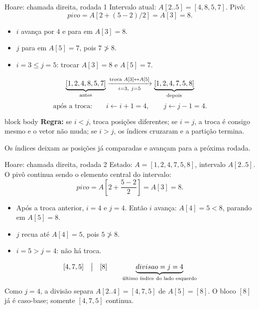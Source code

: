 \documentclass[aspectratio=169,11pt]{beamer}
\begin{document}
\begin{frame}{Hoare: chamada direita, rodada 1}
  \small
  Intervalo atual: \(A[2..5]=[4,8,5,7]\). Pivô:
  \[
    pivo=A[2+(5-2)/2]=A[3]=8.
  \]
  \begin{itemize}
    \item \(i\) avança por \(4\) e para em \(A[3]=8\).
    \item \(j\) para em \(A[5]=7\), pois \(7\not>8\).
    \item \(i=3\leq j=5\): trocar \(A[3]=8\) e \(A[5]=7\).
  \end{itemize}
  \[
    \underbrace{[1,2,4,8,5,7]}_{\text{\scriptsize antes}}
    \xrightarrow[\ i=3,\ j=5\ ]{\text{\scriptsize troca }A[3]\leftrightarrow A[5]}
    \underbrace{[1,2,4,7,5,8]}_{\text{\scriptsize depois}}
  \]
  \[
    \text{após a troca:}\qquad
    i\gets i+1=4,\qquad j\gets j-1=4.
  \]
  \begin{beamercolorbox}[wd=\linewidth,sep=.45em]{block body}
    \centering
    \textbf{Regra:} se \(i<j\), troca posições diferentes;
    se \(i=j\), a troca é consigo mesmo e o vetor não muda;
    se \(i>j\), os índices cruzaram e a partição termina.
  \end{beamercolorbox}
  \scriptsize Os índices deixam as posições já comparadas e avançam para a próxima rodada.
\end{frame}

\begin{frame}{Hoare: chamada direita, rodada 2}
  \small
  Estado: \(A=[1,2,4,7,5,8]\), intervalo \(A[2..5]\).\\
  O pivô continua sendo o elemento central do intervalo:
  \[
    pivo=A\left[2+\frac{5-2}{2}\right]=A[3]=8.
  \]
  \begin{itemize}
    \item Após a troca anterior, \(i=4\) e \(j=4\). Então \(i\) avança:
      \(A[4]=5<8\), parando em \(A[5]=8\).
    \item \(j\) recua até \(A[4]=5\), pois \(5\not>8\).
    \item \(i=5>j=4\): não há troca.
  \end{itemize}
  \[
    [4,7,5]\quad\big|\quad[8]
    \qquad
    \underbrace{divisao=j=4}_{\text{\scriptsize último índice do lado esquerdo}}
  \]
  \scriptsize Como \(j=4\), a divisão separa \(A[2..4]=[4,7,5]\) de \(A[5]=[8]\).
  O bloco \([8]\) já é caso-base; somente \([4,7,5]\) continua.
\end{frame}
\end{document}
